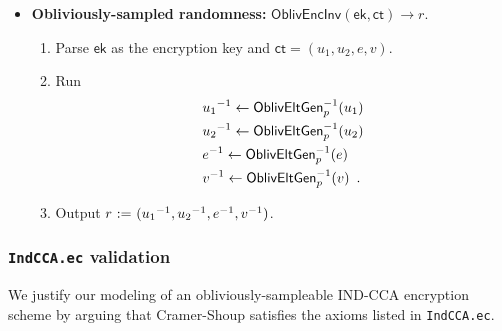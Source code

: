 \documentclass[11pt,letterpaper]{article}
\theoremstyle{plain} %
\theoremstyle{definition} %
\theoremstyle{remark} %
\newcommand{\code}[1]{\texttt{#1}} %
\newcommand{\eqdef}{\ {:=} \ }
\newcommand{\OblivEncInv}{\mathsf{OblivEncInv}}
\newcommand{\EncKey}{\mathsf{ek}}
\newcommand{\Ct}{\mathsf{ct}}
\newcommand{\Rand}{r}
\newcommand{\GrpEltE}{e}
\newcommand{\GrpEltU}{u}
\newcommand{\GrpEltV}{v}
\begin{document}
\begin{itemize}
    \item \textbf{Obliviously-sampled randomness:} $\OblivEncInv(\EncKey, \Ct) \to \Rand$.
    \begin{enumerate}[nolistsep]
        \item Parse $\EncKey$ as the encryption key and $\Ct = (\GrpEltU_1,\GrpEltU_2,\GrpEltE,\GrpEltV)$.
        \item Run
        \begin{align*}
            &\Inv{\GrpEltU_1} \gets \OblivEltInv_{\MultGrpOrd}(\GrpEltU_1)\\
            &\Inv{\GrpEltU_2} \gets \OblivEltInv_{\MultGrpOrd}(\GrpEltU_2)\\
            &\Inv{\GrpEltE} \gets \OblivEltInv_{\MultGrpOrd}(\GrpEltE)\\
            &\Inv{\GrpEltV} \gets \OblivEltInv_{\MultGrpOrd}(\GrpEltV)
            \enspace.
        \end{align*}
        \item Output $\Rand \eqdef (\Inv{\GrpEltU_1}, \Inv{\GrpEltU_2}, \Inv{\GrpEltE}, \Inv{\GrpEltV})$.
    \end{enumerate}
\end{itemize}

\subsubsection{\code{IndCCA.ec} validation}
\label{sec:indcca-model-validation}

We justify our modeling of an obliviously-sampleable IND-CCA encryption scheme by arguing that Cramer-Shoup satisfies the axioms listed in \code{IndCCA.ec}.
\end{document}
